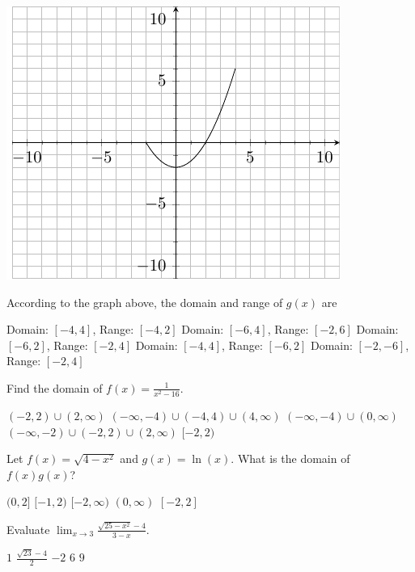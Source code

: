 \documentclass[11pt]{article}
\begin{document}
\begin{questions}
\begin{multiplechoice}{5}
\begin{minipage}{\linewidth}%
\centering
\makebox[\linewidth]{}
\includegraphics{exam1graph2.pdf}
\label{graph2exam1}%
\end{minipage}
According to the graph above, the domain and range of $g(x)$ are
\begin{answers}{2}
\ans Domain: $[-4,4]$, Range: $[-4,2]$
\ans Domain: $[-6,4]$, Range: $[-2,6]$
\ans Domain: $[-6,2]$, Range: $[-2,4]$
\ans Domain: $[-4,4]$, Range: $[-6,2]$
\ans Domain: $[-2,-6]$, Range: $[-2,4]$
\end{answers}

\question Find the domain of $f(x) = \frac{1}{x^2 - 16}$.
\begin{answers}{2}
\ans $(-2,2) \cup (2, \infty)$
\ans $(-\infty, -4) \cup (-4,4) \cup (4, \infty) $
\ans  $(-\infty, -4) \cup (0, \infty)$
\ans  $(-\infty, -2) \cup (-2,2) \cup (2, \infty)$
\ans $[-2,2)$
\end{answers}


\question Let $f(x) = \sqrt{4-x^2}$ and $g(x)=\ln(x)$.  What is the domain of $f(x)g(x)$?
\begin{answers}{2}
\ans $(0,2]$
\ans $[-1,2)$
\ans $[-2,\infty)$
\ans $(0,\infty)$
\ans $[-2,2]$
\end{answers}

\newpage


\question Evaluate $\displaystyle \lim_{x \to 3} \frac{\sqrt{25-x^2} - 4}{3-x}$.
\begin{answers}{3}
\ans $1$
\ans $\frac{\sqrt{23} - 4}{2}$
\ans $-2$
\ans $6$
\ans $9$
\end{answers}




\end{multiplechoice}
\end{questions}
\end{document}

